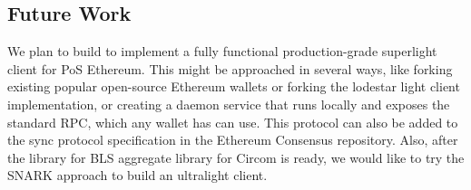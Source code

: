 \documentclass[a4paper,11pt,oneside]{article}
\theoremstyle{definition}
\begin{document}
  \subsection{Future Work}
  We plan to build to implement a fully functional production-grade superlight client for PoS Ethereum. This might be approached in several ways, like forking existing popular open-source Ethereum wallets or forking the lodestar light client implementation, or creating a daemon service that runs locally and exposes the standard RPC, which any wallet has can use. This protocol can also be added to the sync protocol specification in the Ethereum Consensus repository. Also, after the library for BLS aggregate library for Circom is ready, we would like to try the SNARK approach to build an ultralight client.

  \newpage
  \printbibliography
\end{document}
